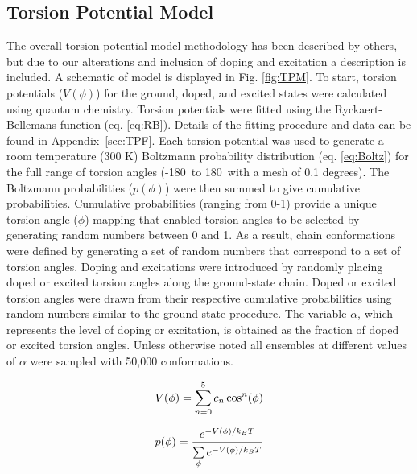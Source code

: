 \subsection{Torsion Potential Model} The overall torsion potential model methodology has been described by others,\cite{Zhang2014, Claudio2001} but due to our alterations and inclusion of doping and excitation a description is included. A schematic of model is displayed in Fig. \ref{fig:TPM}. To start, torsion potentials ($V(\phi)$) for the ground, doped, and excited states were calculated using quantum chemistry. Torsion potentials were fitted using the Ryckaert-Bellemans function (eq. \ref{eq:RB}). Details of the fitting procedure and data can be found in Appendix~\ref{sec:TPF}. Each torsion potential was used to generate a room temperature (300 K) Boltzmann probability distribution (eq. \ref{eq:Boltz}) for the full range of torsion angles (-180\textdegree \ to 180\textdegree \ with a mesh of 0.1 degrees). The Boltzmann probabilities ($p(\phi)$) were then summed to give cumulative probabilities. Cumulative probabilities (ranging from 0-1) provide a unique torsion angle ($\phi$) mapping that enabled torsion angles to be selected by generating random numbers between 0 and 1. As a result, chain conformations were defined by generating a set of random numbers that correspond to a set of torsion angles. Doping and excitations were introduced by randomly placing doped or excited torsion angles along the ground-state chain. Doped or excited torsion angles were drawn from their respective cumulative probabilities using random numbers similar to the ground state procedure. The variable $\alpha$, which represents the level of doping or excitation, is obtained as the fraction of doped or excited torsion angles. Unless otherwise noted all ensembles at different values of $\alpha$ were sampled with 50,000 conformations.

\begin{equation}
\label{eq:RB}
\Large
V(\phi) = \sum_{n=0}^{5} c_n \cos^n(\phi)
\end{equation}

\begin{equation}
\label{eq:Boltz}
\Large
p(\phi) = \frac{e^{-V(\phi)/{k_BT}}}{\sum\limits_{\phi}^{}e^{-V(\phi)/{k_BT}}}
\end{equation}

